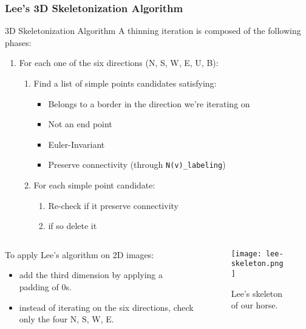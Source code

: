 \begin{frame}
  \frametitle{Lee's 3D Skeletonization Algorithm}
  \begin{block}{3D Skeletonization Algorithm}
    A thinning iteration is composed of the following phases:
    \begin{enumerate}
      \item For each one of the six directions (N, S, W, E, U, B):
            \begin{enumerate}
              \item Find a list of simple points candidates satisfying:
                    \begin{itemize}
                      \item Belongs to a border in the direction we're iterating on
                      \item Not an end point
                      \item Euler-Invariant
                      \item Preserve connectivity (through \lstinline{N(v)_labeling})
                    \end{itemize}
              \item For each simple point candidate:
                    \begin{enumerate}
                      \item Re-check if it preserve connectivity
                      \item if so delete it
                    \end{enumerate}
            \end{enumerate}
    \end{enumerate}
  \end{block}
  \begin{columns}
    \begin{column}[]{0.6\textwidth}
      \vspace{0.5cm}
      To apply Lee's algorithm on 2D images:
      \begin{itemize}
        \item add the third dimension by applying a padding of 0s.
        \item instead of iterating on the six directions, check only the four N, S, W, E.
      \end{itemize}
    \end{column}
    \begin{column}{0.4\textwidth}
      \begin{figure}
        \texttt{[image: lee-skeleton.png]}
        \caption{Lee's skeleton of our horse.}
      \end{figure}
    \end{column}
  \end{columns}

\end{frame}
